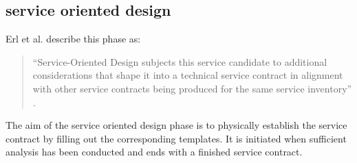 \subsection{service oriented design}

Erl et al. describe this phase as:
\begin{quote}
``Service-Oriented Design subjects this service candidate to additional considerations that shape it into a technical service contract in alignment with other service contracts being produced for the same service inventory'' \cite[p.86]{erl2011}.
\end{quote}


The aim of the service oriented design phase is to physically establish the service contract by filling out the corresponding templates. It is initiated when sufficient analysis has been conducted and ends with a finished service contract.